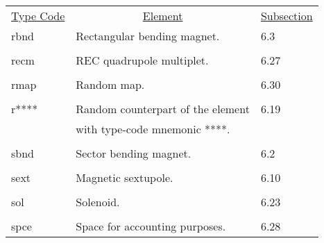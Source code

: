 \begin{center}
\newpage
\begin{tabular}{lll}
\multicolumn{1}{c}{\underline{Type Code}} &
\multicolumn{1}{c}{\underline{Element}}   &
\multicolumn{1}{c}{\underline{Subsection}} \\
\hspace{1.5em}rbnd    &         Rectangular bending magnet.              & \hspace{2em}6.3\\
\vspace{-3mm}& &\\
\hspace{1.5em}recm    &         REC quadrupole multiplet.              & \hspace{2em}6.27\\
\vspace{-3mm}& &\\
\hspace{1.5em}rmap    &         Random map.              & \hspace{2em}6.30\\
\vspace{-3mm}& &\\
\hspace{1.5em}r****   &         Random counterpart of the element   &  \hspace{2em}6.19\\
               &         with type-code mnemonic ****.        &      \\
\vspace{-3mm}& &\\
\hspace{1.5em}sbnd    &         Sector bending magnet.              & \hspace{2em}6.2\\
\vspace{-3mm}& &\\
\hspace{1.5em}sext    &         Magnetic sextupole.                  &  \hspace{2em}6.10\\
\vspace{-3mm}& &\\
\hspace{1.5em}sol    &         Solenoid.                            &  \hspace{2em}6.23\\
\vspace{-3mm}& &\\
\hspace{1.5em}spce    &         Space for accounting purposes.   &  \hspace{2em}6.28\\

\end{tabular}
\end{center}
